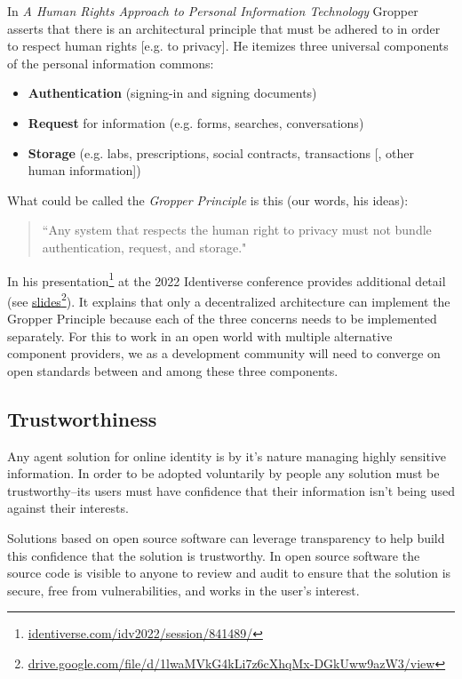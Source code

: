 \documentclass[11pt, oneside]{article}   	%
\newcommand{\hyperfootnote}[1][]{\def\ArgI{{#1}}\hyperfootnoteRelay}
\newcommand\hyperfootnoteRelay[2][]{\href{#1#2}{\ArgI}\footnote{\href{#1#2}{#2}}}
\begin{document}
In \emph{A Human Rights Approach to Personal Information Technology}\cite{Gropper2022} Gropper asserts that there is an architectural principle that must be adhered to in order to respect human rights [e.g. to privacy]. He itemizes three universal components of the personal information commons:

\begin{itemize}
\item \textbf{Authentication} (signing-in and signing documents)
\item \textbf{Request} for information (e.g. forms, searches, conversations)
\item \textbf{Storage} (e.g. labs, prescriptions, social contracts, transactions [, other human information])
\end{itemize}

What could be called the \emph{Gropper Principle} is this (our words, his ideas):
\begin{quote}
``Any system that respects the human right to privacy must not bundle authentication, request, and storage."
\end{quote}

In his presentation\hyperfootnote[][https://]{identiverse.com/idv2022/session/841489/} at the 2022 Identiverse conference provides additional detail (see \hyperfootnote[slides][https://]{drive.google.com/file/d/1lwaMVkG4kLi7z6cXhqMx-DGkUww9azW3/view}). It explains that only a decentralized architecture can implement the Gropper Principle because each of the three concerns needs to be implemented separately. For this to work in an open world with multiple alternative component providers, we as a development community will need to converge on open standards between and among these three components. 

\subsection{Trustworthiness}

Any agent solution for online identity is by it's nature managing highly sensitive information. In order to be adopted voluntarily by people any solution must be trustworthy--its users must have confidence that their information isn't being used against their interests. 

Solutions based on open source software can leverage transparency to help build this confidence that the solution is trustworthy. In open source software the source code is visible to anyone to review and audit to ensure that the solution is secure, free from vulnerabilities, and works in the user's interest.
\end{document}

